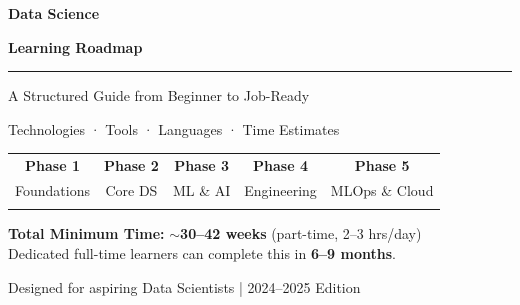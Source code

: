 \documentclass[a4paper,11pt]{article}
\begin{document}
\begin{titlepage}
  \centering
  \vspace*{2cm}
  {\Huge\bfseries\color{primary} Data Science\par}
  {\Huge\bfseries\color{accent} Learning Roadmap\par}
  \vspace{0.5cm}
  \textcolor{darkgray}{\rule{0.6\linewidth}{1.5pt}}
  \vspace{0.8cm}

  {\large\color{darkgray} A Structured Guide from Beginner to Job-Ready}\par
  \vspace{0.5cm}
  {\normalsize\color{darkgray} Technologies · Tools · Languages · Time Estimates}\par

  \vspace{2cm}

  \begin{tabular}{ccccc}
    \cellcolor{beginner}\textbf{Phase 1} &
    \cellcolor{beginner!60}\textbf{Phase 2} &
    \cellcolor{intermediate}\textbf{Phase 3} &
    \cellcolor{intermediate!60}\textbf{Phase 4} &
    \cellcolor{advanced}\textbf{Phase 5} \\[4pt]
    \cellcolor{beginner}Foundations &
    \cellcolor{beginner!60}Core DS &
    \cellcolor{intermediate}ML \& AI &
    \cellcolor{intermediate!60}Engineering &
    \cellcolor{advanced}MLOps \& Cloud \\[4pt]
    \cellcolor{beginner}{\small 4--6 wks} &
    \cellcolor{beginner!60}{\small 6--8 wks} &
    \cellcolor{intermediate}{\small 8--12 wks} &
    \cellcolor{intermediate!60}{\small 6--8 wks} &
    \cellcolor{advanced}{\small 6--8 wks} \\
  \end{tabular}

  \vspace{1cm}
  \begin{infobox}
    \centering
    \textbf{Total Minimum Time:} $\sim$\textbf{30--42 weeks} (part-time, 2--3 hrs/day)\\
    \small Dedicated full-time learners can complete this in \textbf{6--9 months}.
  \end{infobox}

  \vfill
  {\small\color{darkgray} Designed for aspiring Data Scientists | 2024--2025 Edition}
\end{titlepage}
\end{document}
